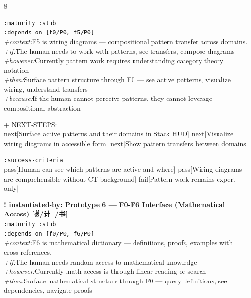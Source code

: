 \documentclass[landscape]{article}
\newcommand{\flexitag}[1]{\textcolor[gray]{0.35}{\textit{#1}}}
\newenvironment{devmapstub}{%
  \def\FrameCommand{\colorbox{devmapstubbg}}%
  \setlength{\fboxsep}{2pt}%
  \MakeFramed{\advance\hsize-\width \FrameRestore}%
}{\endMakeFramed}
\begin{document}
\begin{paracol}{8}
\begin{devmapstub}
  \texttt{:\allowbreak{}maturity :\allowbreak{}stub}\\
  \texttt{:\allowbreak{}depends-\allowbreak{}on [f0/\allowbreak{}P0,\allowbreak{} f5/\allowbreak{}P0]}\\
  \flexitag{+context:}F5 is wiring diagrams — compositional pattern transfer across domains.\\
  \flexitag{+if:}The human needs to work with patterns, see transfers, compose diagrams\\
  \flexitag{+however:}Currently pattern work requires understanding category theory notation\\
  \flexitag{+then:}Surface pattern structure through F0 — see active patterns, visualize wiring, understand transfers\\
  \flexitag{+because:}If the human cannot perceive patterns, they cannot leverage compositional abstraction\\
\par
  + NEXT-STEPS:\\
    next[Surface active patterns and their domains in Stack HUD] next[Visualize wiring diagrams in accessible form] next[Show pattern transfers between domains]\\
\par
  \texttt{:\allowbreak{}success-\allowbreak{}criteria}\\
    pass[Human can see which patterns are active and where] pass[Wiring diagrams are comprehensible without CT background] fail[Pattern work remains expert-only]\\
\par
\par
\end{devmapstub}
\begin{devmapstub}
\textbf{! instantiated-by: Prototype 6 — F0-F6 Interface (Mathematical Access) [✌️/计 📁/书]}\\
  \texttt{:\allowbreak{}maturity :\allowbreak{}stub}\\
  \texttt{:\allowbreak{}depends-\allowbreak{}on [f0/\allowbreak{}P0,\allowbreak{} f6/\allowbreak{}P0]}\\
  \flexitag{+context:}F6 is mathematical dictionary — definitions, proofs, examples with cross-references.\\
  \flexitag{+if:}The human needs random access to mathematical knowledge\\
  \flexitag{+however:}Currently math access is through linear reading or search\\
  \flexitag{+then:}Surface mathematical structure through F0 — query definitions, see dependencies, navigate proofs\\

\end{devmapstub}
\end{paracol}
\end{document}
